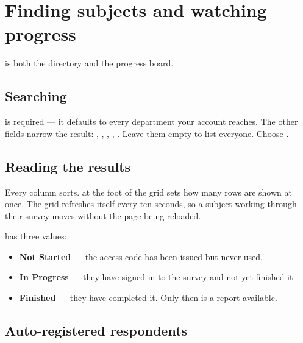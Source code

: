 \documentclass[11pt, a4paper]{article}
\begin{document}
\section{Finding subjects and watching progress}
\label{sec:search}

 is both the directory and the progress board.

\subsection{Searching}

 is required — it defaults to every department your account reaches. The other
fields narrow the result: , , , ,
. Leave them empty to list everyone. Choose .


\subsection{Reading the results}


Every column sorts.  at the foot of the grid sets how many rows are shown at once.
The grid refreshes itself every ten seconds, so a subject working through their survey moves
without the page being reloaded.

 has three values:

\begin{itemize}
  \item \textbf{Not Started} — the access code has been issued but never used.
  \item \textbf{In Progress} — they have signed in to the survey and not yet finished it.
  \item \textbf{Finished} — they have completed it. Only then is a report available.
\end{itemize}

\subsection{Auto-registered respondents}
\end{document}
